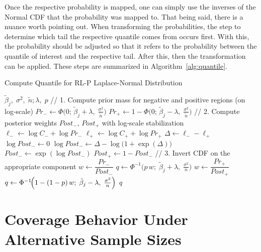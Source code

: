 Once the respective probability is mapped, one can simply use the inverses of the Normal CDF that the probability was mapped to. That being said, there is a nuance worth pointing out. When transforming the probabilities, the step to determine which tail the respective quantile comes from occurs first. With this, the probability should be adjusted so that it refers to the probability between the quantile of interest and the respective tail. After this, then the transformation can be applied. These steps are summarized in Algorithm~\ref{alg:quantile}.

\begin{algorithm}
\caption{Compute Quantile for RL-P Laplace-Normal Distribution}
\label{alg:quantile}
\begin{algorithmic}[1]
  \Require
    $\tilde{\beta}_j,\;\sigma^2,\;\tilde{n};\lambda,\;p$ 
  \Statex
  \State // 1. Compute prior mass for negative and positive regions (on log‐scale)
  \State $Pr_{-} \gets \Phi\bigl(0;\,\tilde{\beta}_j + \lambda,\;\tfrac{\sigma^2}{\tilde{n}}\bigr)$
  \State $Pr_{+} \gets 1 - \Phi\bigl(0;\,\tilde{\beta}_j - \lambda,\;\tfrac{\sigma^2}{\tilde{n}}\bigr)$
  \Statex
  \State // 2. Compute posterior weights $Post_{-},\,Post_{+}$ with log‐scale stabilization
  \State $\ell_{-} \gets \log C_{-} + \log Pr_{-}$
  \State $\ell_{+} \gets \log C_{+} + \log Pr_{+}$
  \State $\Delta \gets \ell_{-} - \ell_{+}$
  \If{$\exp(\Delta) = \infty$}
    \State $\log Post_{-} \gets 0$  
  \Else
    \State $\log Post_{-} \gets \Delta - \log\bigl(1 + \exp(\Delta)\bigr)$
  \EndIf
  \State $Post_{-} \gets \exp(\log Post_{-})$
  \State $Post_{+} \gets 1 - Post_{-}$
  \Statex
  \State // 3. Invert CDF on the appropriate component
    \State $w \gets \dfrac{Pr_{-}}{Post_{-}}$
    \State $q \gets \Phi^{-1}\bigl(p \,w;\;\tilde{\beta}_j + \lambda,\;\tfrac{\sigma^2}{n}\bigr)$
  \Else
    \State $w \gets \dfrac{Pr_{+}}{Post_{+}}$
    \State $q \gets \Phi^{-1}\!\Bigl(1 - (1-p)\,w;\;\tilde{\beta}_j - \lambda,\;\tfrac{\sigma^2}{n}\Bigr)$
  \EndIf
  \State \Return $q$
\end{algorithmic}
\end{algorithm}

\clearpage

\section{Coverage Behavior Under Alternative Sample Sizes}\label{Sup:alt_ns}

